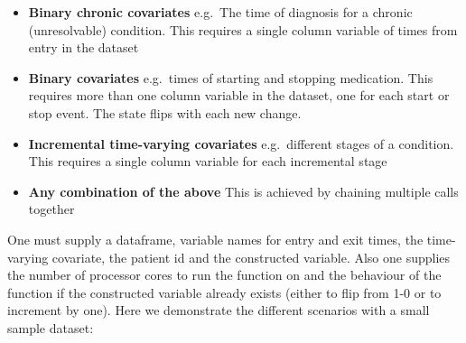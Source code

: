 \documentclass[]{article}
\begin{document}
\begin{itemize}
\itemsep1pt\parskip0pt
\item
  \textbf{Binary chronic covariates} e.g.~The time of diagnosis for a
  chronic (unresolvable) condition. This requires a single column
  variable of times from entry in the dataset
\item
  \textbf{Binary covariates} e.g.~times of starting and stopping
  medication. This requires more than one column variable in the
  dataset, one for each start or stop event. The state flips with each
  new change.
\item
  \textbf{Incremental time-varying covariates} e.g.~different stages of
  a condition. This requires a single column variable for each
  incremental stage
\item
  \textbf{Any combination of the above} This is achieved by chaining
  multiple calls together
\end{itemize}

One must supply a dataframe, variable names for entry and exit times,
the time-varying covariate, the patient id and the constructed variable.
Also one supplies the number of processor cores to run the function on
and the behaviour of the function if the constructed variable already
exists (either to flip from 1-0 or to increment by one). Here we
demonstrate the different scenarios with a small sample dataset:
\end{document}
